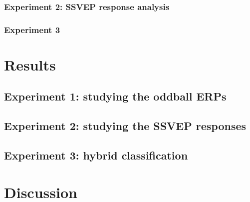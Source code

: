 \documentclass[10pt]{article}
\begin{document}
        \subsubsection{Experiment 2: SSVEP response analysis}
        \label{sec:2.3.2AnalysisExp2}




        \subsubsection{Experiment 3}
        \label{sec:2.3.3AnalysisExp3}

\section{Results}
\label{sec:3Results}

    \subsection{Experiment 1: studying the oddball \acsp{ERP}}
    \label{sec:2.2Oddball}


    \subsection{Experiment 2: studying the \acs{SSVEP} responses}
    \label{sec:2.3SSVEP}


    \subsection{Experiment 3: hybrid classification}
    \label{sec:2.4Hybrid}


\section{Discussion}
\label{sec:4Discuss}
\end{document}
